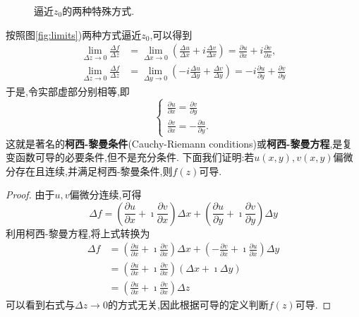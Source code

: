 \begin{figure}
    \centering
    
    \caption{逼近$z_0$的两种特殊方式.}
    \label{fig:limits}
\end{figure}
按照图\eqref{fig:limits})两种方式逼近$z_0$,可以得到
\begin{align}
    \lim _{\Delta z \rightarrow 0} \frac{\Delta f}{\Delta z} &=\lim _{\Delta x \rightarrow 0}\left(\frac{\Delta u}{\Delta x}+i \frac{\Delta v}{\Delta x}\right)=\frac{\partial u}{\partial x}+i \frac{\partial v}{\partial x},
\\
    \lim _{\Delta z \rightarrow 0} \frac{\Delta f}{\Delta z} &=\lim _{\Delta y \rightarrow 0}\left(-i \frac{\Delta u}{\Delta y}+\frac{\Delta v}{\Delta y}\right)=-i \frac{\partial u}{\partial y}+\frac{\partial v}{\partial y}
\end{align}
于是,令实部虚部分别相等,即
\begin{equation}
    \begin{cases}
        \frac{\partial u}{\partial x}=\frac{\partial v}{\partial y} \\
        \frac{\partial v}{\partial x}=-\frac{\partial u}{\partial y} .
    \end{cases}
\end{equation}
这就是著名的{\bf 柯西-黎曼条件}(Cauchy-Riemann conditions)或{\bf 柯西-黎曼方程},是复变函数可导的必要条件,但不是充分条件.
下面我们证明:若$u(x,y), v(x,y)$偏微分存在且连续,并满足柯西-黎曼条件,则$f(z)$可导.
\begin{proof}
    由于$u,v$偏微分连续,可得
    \begin{equation*}
        \Delta f=\left(\frac{\partial u}{\partial x}+\imath \frac{\partial v}{\partial x}\right) \Delta x+\left(\frac{\partial u}{\partial y}+ \imath \frac{\partial v}{\partial y}\right) \Delta y
    \end{equation*}
    利用柯西-黎曼方程,将上式转换为
    \begin{equation*}
        \begin{aligned}
        \Delta f & =\left(\frac{\partial u}{\partial x}+ \imath \frac{\partial v}{\partial x}\right) \Delta x+\left(-\frac{\partial v}{\partial x}+ \imath\frac{\partial u}{\partial x}\right) \Delta y \\
        & =\left(\frac{\partial u}{\partial x}+ \imath \frac{\partial v}{\partial x}\right)(\Delta x+ \imath \Delta y) 
        \\
        & = \left(\frac{\partial u}{\partial x}+ \imath \frac{\partial v}{\partial x}\right) \Delta z
        \end{aligned}
    \end{equation*}
可以看到右式与$\Delta z\to 0$的方式无关,因此根据可导的定义判断$f(z)$可导.
\end{proof}
